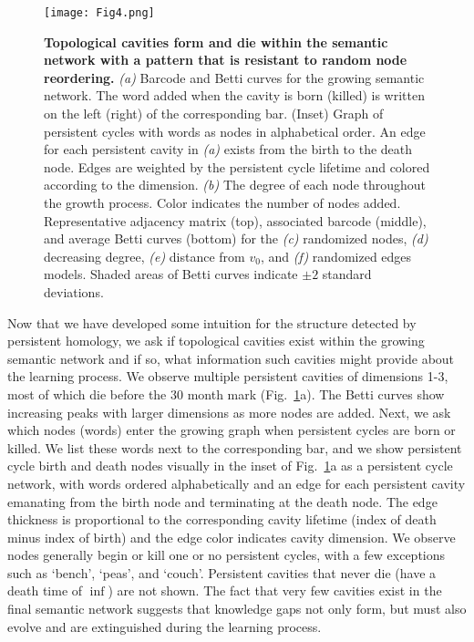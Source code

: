 \documentclass{article}
\begin{document}
\begin{figure}
	\centering
	\texttt{[image: Fig4.png]}
	\caption{\textbf{Topological cavities form and die within the semantic network with a pattern that is resistant to random node reordering.} \emph{(a)} Barcode and Betti curves for the growing semantic network. The word added when the cavity is born (killed) is written on the left (right) of the corresponding bar. (Inset) Graph of persistent cycles with words as nodes in alphabetical order. An edge for each persistent cavity in \emph{(a)} exists from the birth to the death node. Edges are weighted by the persistent cycle lifetime and colored according to the dimension. \emph{(b)} The degree of each node throughout the growth process. Color indicates the number of nodes added. Representative adjacency matrix (top), associated barcode (middle), and average Betti curves (bottom) for the \emph{(c)} randomized nodes, \emph{(d)} decreasing degree, \emph{(e)} distance from $v_0$, and \emph{(f)} randomized edges models. Shaded areas of Betti curves indicate $\pm2$ standard deviations.}
	\label{fig:4}
\end{figure}

Now that we have developed some intuition for the structure detected by persistent homology, we ask if topological cavities exist within the growing semantic network and if so, what information such cavities might provide about the learning process. We observe multiple persistent cavities of dimensions 1-3, most of which die before the 30 month mark (Fig.~\ref{fig:4}a). The Betti curves show increasing peaks with larger dimensions as more nodes are added. Next, we ask which nodes (words) enter the growing graph when persistent cycles are born or killed. We list these words next to the corresponding bar, and we show persistent cycle birth and death nodes visually in the inset of Fig.~\ref{fig:4}a as a persistent cycle network, with words ordered alphabetically and an edge for each persistent cavity emanating from the birth node and terminating at the death node. The edge thickness is proportional to the corresponding cavity lifetime (index of death minus index of birth) and the edge color indicates cavity dimension. We observe nodes generally begin or kill one or no persistent cycles, with a few exceptions such as `bench', `peas', and `couch'. Persistent cavities that never die (have a death time of $\inf$) are not shown. The fact that very few cavities exist in the final semantic network suggests that knowledge gaps not only form, but must also evolve and are extinguished during the learning process.
\end{document}
